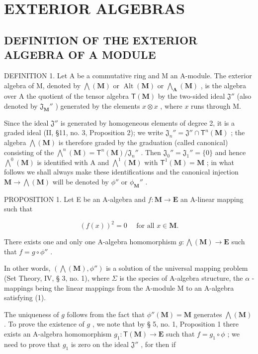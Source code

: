 \section{EXTERIOR ALGEBRAS}

\subsection{DEFINITION OF THE EXTERIOR ALGEBRA OF A MODULE}

DEFINITION 1. Let A be a commutative ring and M an A-module. The exterior algebra of M, denoted by \(\bigwedge (\mathbf{M})\) or \(\operatorname {Alt}(\mathbf{M})\) or \(\bigwedge_{\mathbf{A}}(\mathbf{M})\) , is the algebra over A the quotient of the tensor algebra \(\mathsf{T}(\mathbf{M})\) by the two-sided ideal \(\mathfrak{J}''\) (also denoted by \(\mathfrak{J}_{\mathbf{M}}''\) ) generated by the elements \(x\otimes x\) , where \(x\) runs through M.

Since the ideal \(\mathfrak{J}''\) is generated by homogeneous elements of degree 2, it is a graded ideal (II, §11, no. 3, Proposition 2); we write \(\mathfrak{J}_n'' = \mathfrak{J}'' \cap \mathsf{T}^n(\mathbf{M})\) ; the algebra \(\bigwedge(\mathbf{M})\) is therefore graded by the graduation (called canonical) consisting of the \(\bigwedge^n(\mathbf{M}) = \mathsf{T}^n(\mathbf{M}) / \mathfrak{J}_n''\) . Then \(\mathfrak{J}_0'' = \mathfrak{J}_1'' = \{0\}\) and hence \(\bigwedge^0(\mathbf{M})\) is identified with A and \(\bigwedge^1(\mathbf{M})\) with \(\mathsf{T}^1(\mathbf{M}) = \mathbf{M}\) ; in what follows we shall always make these identifications and the canonical injection \(\mathbf{M} \to \bigwedge(\mathbf{M})\) will be denoted by \(\phi''\) or \(\phi_{\mathbf{M}}''\) .

PROPOSITION 1. Let E be an A-algebra and \(f: \mathbf{M} \to \mathbf{E}\) an A-linear mapping such that

\[
(f (x)) ^ {2} = 0 \quad \text { for all } x \in \mathbf {M}.\tag{1}
\]

There exists one and only one A-algebra homomorphism \(g: \bigwedge(\mathbf{M}) \to \mathbf{E}\) such that \(f = g \circ \phi''\) .

In other words, \((\bigwedge (\mathbf{M}),\phi '')\) is a solution of the universal mapping problem (Set Theory, IV, § 3, no. 1), where \(\Sigma\) is the species of A-algebra structure, the \(\alpha\) -mappings being the linear mappings from the A-module M to an A-algebra satisfying (1).

The uniqueness of \(g\) follows from the fact that \(\phi''(\mathbf{M}) = \mathbf{M}\) generates \(\bigwedge (\mathbf{M})\) . To prove the existence of \(g\) , we note that by § 5, no. 1, Proposition 1 there exists an A-algebra homomorphism \(g_1: \mathsf{T}(\mathbf{M}) \to \mathbf{E}\) such that \(f = g_1 \circ \phi\) ; we need to prove that \(g_1\) is zero on the ideal \(\mathfrak{J}''\) , for then if

